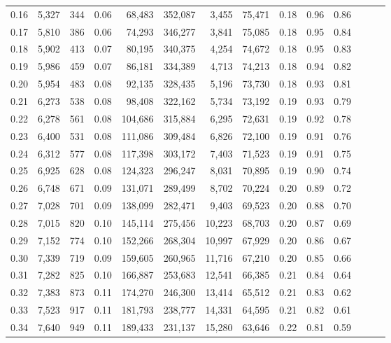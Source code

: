 \begin{tabular}{rrrrrrrrrrrrrr}
0.16 &  5,327 &    344 &  0.06 &   68,483 &  352,087 &   3,455 &  75,471 &  0.18 &  0.96 &      0.86 \\
0.17 &  5,810 &    386 &  0.06 &   74,293 &  346,277 &   3,841 &  75,085 &  0.18 &  0.95 &      0.84 \\
0.18 &  5,902 &    413 &  0.07 &   80,195 &  340,375 &   4,254 &  74,672 &  0.18 &  0.95 &      0.83 \\
0.19 &  5,986 &    459 &  0.07 &   86,181 &  334,389 &   4,713 &  74,213 &  0.18 &  0.94 &      0.82 \\
0.20 &  5,954 &    483 &  0.08 &   92,135 &  328,435 &   5,196 &  73,730 &  0.18 &  0.93 &      0.81 \\
0.21 &  6,273 &    538 &  0.08 &   98,408 &  322,162 &   5,734 &  73,192 &  0.19 &  0.93 &      0.79 \\
0.22 &  6,278 &    561 &  0.08 &  104,686 &  315,884 &   6,295 &  72,631 &  0.19 &  0.92 &      0.78 \\
0.23 &  6,400 &    531 &  0.08 &  111,086 &  309,484 &   6,826 &  72,100 &  0.19 &  0.91 &      0.76 \\
0.24 &  6,312 &    577 &  0.08 &  117,398 &  303,172 &   7,403 &  71,523 &  0.19 &  0.91 &      0.75 \\
0.25 &  6,925 &    628 &  0.08 &  124,323 &  296,247 &   8,031 &  70,895 &  0.19 &  0.90 &      0.74 \\
0.26 &  6,748 &    671 &  0.09 &  131,071 &  289,499 &   8,702 &  70,224 &  0.20 &  0.89 &      0.72 \\
0.27 &  7,028 &    701 &  0.09 &  138,099 &  282,471 &   9,403 &  69,523 &  0.20 &  0.88 &      0.70 \\
0.28 &  7,015 &    820 &  0.10 &  145,114 &  275,456 &  10,223 &  68,703 &  0.20 &  0.87 &      0.69 \\
0.29 &  7,152 &    774 &  0.10 &  152,266 &  268,304 &  10,997 &  67,929 &  0.20 &  0.86 &      0.67 \\
0.30 &  7,339 &    719 &  0.09 &  159,605 &  260,965 &  11,716 &  67,210 &  0.20 &  0.85 &      0.66 \\
0.31 &  7,282 &    825 &  0.10 &  166,887 &  253,683 &  12,541 &  66,385 &  0.21 &  0.84 &      0.64 \\
0.32 &  7,383 &    873 &  0.11 &  174,270 &  246,300 &  13,414 &  65,512 &  0.21 &  0.83 &      0.62 \\
0.33 &  7,523 &    917 &  0.11 &  181,793 &  238,777 &  14,331 &  64,595 &  0.21 &  0.82 &      0.61 \\
0.34 &  7,640 &    949 &  0.11 &  189,433 &  231,137 &  15,280 &  63,646 &  0.22 &  0.81 &      0.59 \\

\end{tabular}
